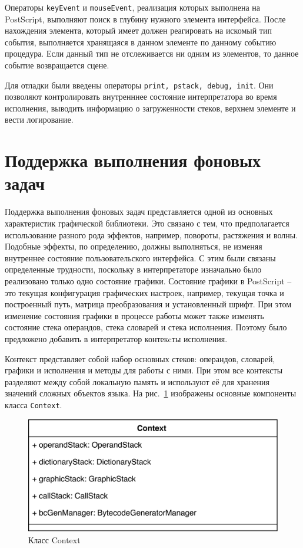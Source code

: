 Операторы \texttt{keyEvent} и \texttt{mouseEvent}, реализация которых выполнена на PostScript, выполняют поиск в глубину нужного элемента интерфейса. После нахождения элемента, который имеет должен реагировать на искомый тип события, выполняется хранящаяся в данном элементе по данному событию процедура. Если данный тип не отслеживается ни одним из элементов, то данное событие возвращается сцене.

Для отладки были введены операторы \texttt{print, pstack, debug, init}. Они позволяют контролировать внутренннее состояние интерпретатора во время исполнения, выводить информацию о загруженности стеков, верхнем элементе и вести логирование.


\section{Поддержка выполнения фоновых задач}
Поддержка выполнения фоновых задач представляется одной из основных характеристик графической библиотеки. Это связано с тем, что предполагается использование разного рода эффектов, например, повороты, растяжения и волны. Подобные эффекты, по определению, должны выполняться, не изменяя внутреннее состояние пользовательского интерфейса. С этим были связаны определенные трудности, поскольку в интерпретаторе изначально было реализовано только одно состояние графики. Состояние графики в PostScript -- это текущая конфигурация графических настроек, например,   текущая точка и построенный путь, матрица преобразования и установленный шрифт. При этом изменение состояния графики в процессе работы может также изменять состояние стека операндов, стека словарей и стека исполнения. Поэтому было предложено добавить в интерпретатор контекcты исполнения.

Контекст представляет собой набор основных стеков: операндов, словарей, графики и исполнения и методы для работы с ними. При этом все контексты разделяют между собой локальную память и используют её для хранения значений сложных объектов языка. На рис.~\ref{context} изображены основные компоненты класса \texttt{Context}.

\begin{figure}[h!]
\centering
	\includegraphics[width=\textwidth]{Makulov/Context.png}
	\caption{Класс Context}
        \label{context}
\end{figure}


